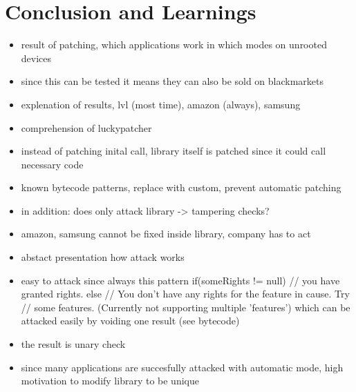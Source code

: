 \section{Conclusion and Learnings} \label{section:luckypatcher-learnings}
\begin{itemize}
    \item result of patching, which applications work in which modes on unrooted devices
    \item since this can be tested it means they can also be sold on blackmarkets
    \item explenation of results, lvl (most time), amazon (always), samsung
    \item comprehension of luckypatcher
    \item instead of patching inital call, library itself is patched since it could call necessary code
    \item known bytecode patterns, replace with custom, prevent automatic patching
    \item in addition: does only attack library -> tampering checks?
    \item amazon, samsung cannot be fixed inside library, company has to act
    \item abstact presentation how attack works
    \item easy to attack since always this pattern if(someRights != null){
           // you have granted rights.
       } else {
           // You don't have any rights for the feature in cause. Try
           // some features. (Currently not supporting multiple 'features')
       } which can be attacked easily by voiding one result (see bytecode)
       \item the result is unary check
    \item since many applications are succesfully attacked with automatic mode, high motivation to modify library to be unique
\end{itemize}

